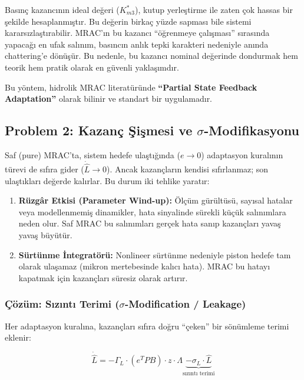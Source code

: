 \documentclass[12pt,a4paper]{article}
\begin{document}
\begin{cozum}
Basınç kazancının ideal değeri ($K_{m3}^*$), kutup yerleştirme ile zaten çok hassas bir şekilde hesaplanmıştır. Bu değerin birkaç yüzde sapması bile sistemi kararsızlaştırabilir. MRAC'ın bu kazancı ``öğrenmeye çalışması'' sırasında yapacağı en ufak salınım, basıncın anlık tepki karakteri nedeniyle anında chattering'e dönüşür. Bu nedenle, bu kazancı nominal değerinde dondurmak hem teorik hem pratik olarak en güvenli yaklaşımdır.

Bu yöntem, hidrolik MRAC literatüründe \textbf{``Partial State Feedback Adaptation''} olarak bilinir ve standart bir uygulamadır.
\end{cozum}

\subsection{Problem 2: Kazanç Şişmesi ve $\sigma$-Modifikasyonu}
\label{subsec:sigma}

Saf (pure) MRAC'ta, sistem hedefe ulaştığında ($e \to 0$) adaptasyon kuralının türevi de sıfıra gider ($\dot{\hat{L}} \to 0$). Ancak kazançların kendisi sıfırlanmaz; son ulaştıkları değerde kalırlar. Bu durum iki tehlike yaratır:

\begin{enumerate}
    \item \textbf{Rüzgâr Etkisi (Parameter Wind-up):} Ölçüm gürültüsü, sayısal hatalar veya modellenmemiş dinamikler, hata sinyalinde sürekli küçük salınımlara neden olur. Saf MRAC bu salınımları gerçek hata sanıp kazançları yavaş yavaş büyütür.
    \item \textbf{Sürtünme İntegratörü:} Nonlineer sürtünme nedeniyle piston hedefe tam olarak ulaşamaz (mikron mertebesinde kalıcı hata). MRAC bu hatayı kapatmak için kazançları süresiz olarak artırır.
\end{enumerate}

\subsubsection{Çözüm: Sızıntı Terimi ($\sigma$-Modification / Leakage)}

Her adaptasyon kuralına, kazançları sıfıra doğru ``çeken'' bir sönümleme terimi eklenir:

\begin{equation}
    \dot{\hat{L}} = -\Gamma_L \cdot (e^T P B) \cdot z \cdot \Lambda \underbrace{- \sigma_L \cdot \hat{L}}_{\text{sızıntı terimi}}
\end{equation}
\end{document}
